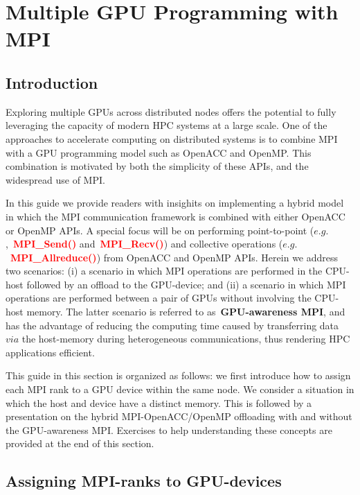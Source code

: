 \section{Multiple GPU Programming with MPI}


\subsection{Introduction}


\par
Exploring multiple GPUs across distributed nodes offers the potential to fully leveraging the capacity of modern HPC systems at a large scale.
One of the approaches to accelerate computing on distributed systems is to combine MPI with a GPU programming model such as OpenACC and OpenMP.
This combination is motivated by both the simplicity of these APIs, and the widespread use of MPI.


\par
In this guide we provide readers with insighits on implementing a hybrid model in which the MPI communication framework is combined with either OpenACC or OpenMP APIs.
A special focus will be on performing point-to-point ($e.g.$,~\textbf{\textcolor{red}{MPI\_Send()}} and~\textbf{\textcolor{red}{MPI\_Recv()}}) and collective operations ($e.g.$~\textbf{\textcolor{red}{MPI\_Allreduce()}}) from OpenACC and OpenMP APIs.
Herein we address two scenarios: (i) a scenario in which MPI operations are performed in the CPU-host followed by an offload to the GPU-device; and (ii) a scenario in which MPI operations are performed between a pair of GPUs without involving the CPU-host memory.
The latter scenario is referred to as~\textbf{GPU-awareness MPI}, and has the advantage of reducing the computing time caused by transferring data $via$ the host-memory during heterogeneous communications, thus rendering HPC applications efficient.


\par
This guide in this section is organized as follows: we first introduce how to assign each MPI rank to a GPU device within the same node.
We consider a situation in which the host and device have a distinct memory.
This is followed by a presentation on the hybrid MPI-OpenACC/OpenMP offloading with and without the GPU-awareness MPI.
Exercises to help understanding these concepts are provided at the end of this section.




\subsection{Assigning MPI-ranks to GPU-devices}



